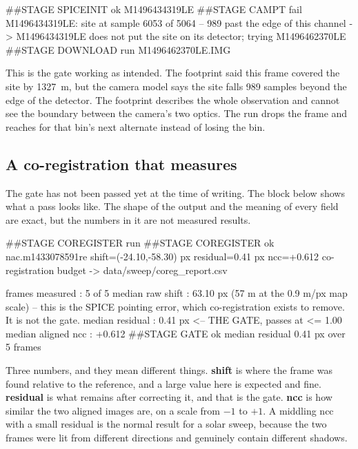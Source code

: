 \documentclass[11pt]{article}
\newcommand{\gr}[1]{\textcolor{termok}{#1}}
\newcommand{\rd}[1]{\textcolor{termbad}{#1}}
\newcommand{\cy}[1]{\textcolor{termcy}{#1}}
\begin{document}
\begin{console}
\begin{term}
##STAGE SPICEINIT \gr{ok} M1496434319LE
##STAGE CAMPT \rd{fail} M1496434319LE: site at sample 6053 of 5064
              -- 989 past the edge of this channel
   -> M1496434319LE does not put the site on its detector;
      trying M1496462370LE
##STAGE DOWNLOAD run M1496462370LE.IMG
\end{term}
\end{console}

This is the gate working as intended. The footprint said this frame covered the site
by \SI{1327}{\meter}, but the camera model says the site falls 989 samples beyond the
edge of the detector. The footprint describes the whole observation and cannot see the
boundary between the camera's two optics. The run drops the frame and reaches for that
bin's next alternate instead of losing the bin.

\subsection{A co-registration that measures}

\begin{limitbox}
The gate has not been passed yet at the time of writing. The block below shows what a
pass looks like. The shape of the output and the meaning of every field are exact, but
the numbers in it are not measured results.
\end{limitbox}

\begin{console}
\begin{term}
##STAGE COREGISTER run
##STAGE COREGISTER \gr{ok} nac.m1433078591re
        shift=(-24.10,-58.30) px  residual=0.41 px  ncc=+0.612
co-registration budget -> data/sweep/coreg_report.csv

  frames measured        : 5 of 5
  median raw shift       : 63.10 px   (57 m at the 0.9 m/px map scale)
     -- this is the SPICE pointing error, which co-registration
        exists to remove. It is not the gate.
  median residual        : \cy{0.41 px}   <-- THE GATE, passes at <= 1.00
  median aligned ncc     : +0.612
##STAGE GATE \gr{ok} median residual 0.41 px over 5 frames
\end{term}
\end{console}

Three numbers, and they mean different things. \textbf{shift} is where the frame was
found relative to the reference, and a large value here is expected and fine.
\textbf{residual} is what remains after correcting it, and that is the gate.
\textbf{ncc} is how similar the two aligned images are, on a scale from $-1$ to $+1$.
A middling ncc with a small residual is the normal result for a solar sweep, because
the two frames were lit from different directions and genuinely contain different
shadows.
\end{document}
